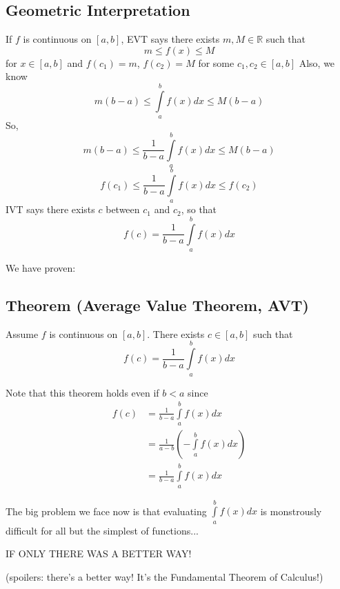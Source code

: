 \subsection{Geometric Interpretation}
If $ f $ is continuous on $ [a,b] $, EVT says there exists $ m,M\in\mathbb{R} $ such that
\[m\le f(x) \le M\]
for $ x\in[a,b] $ and $ f(c_1)=m $, $ f(c_2)=M $ for some $ c_1,c_2\in[a,b] $ 
Also, we know \[ m(b-a)\le \int\limits_{a}^{b} f(x) d{x} \le M(b-a) \]
So,
\[ m(b-a)\le \frac{1}{b-a} \int\limits_{a}^{b} f(x) d{x} \le M(b-a) \]
\[ f(c_1)\le \frac{1}{b-a} \int\limits_{a}^{b} f(x) d{x} \le f(c_2) \]
IVT says there exists $ c $ between $ c_1 $ and $ c_2 $, so that
\[ f(c)=\frac{1}{b-a} \int\limits_{a}^{b} f(x) d{x} \]

We have proven:
\subsection{Theorem (Average Value Theorem, AVT)}
Assume $ f $ is continuous on $ [a,b] $. There exists $ c\in[a,b] $ such that
\[ f(c)=\frac{1}{b-a} \int\limits_{a}^{b} f(x) d{x} \]

\begin{remark}
    Note that this theorem holds even if $ b<a $ since
    \begin{align*}
        f(c)&=\frac{1}{b-a} \int\limits_{a}^{b} f(x) d{x}\\
            &=\frac{1}{a-b}\left(-\int\limits_{a}^{b} f(x) d{x}\right)\\
            &=\frac{1}{b-a} \int\limits_{a}^{b} f(x) d{x}
    \end{align*}
\end{remark}

The big problem we face now is that evaluating $ \int\limits_{a}^{b} f(x) d{x} $ is
monstrously difficult for all but the simplest of functions...

IF ONLY THERE WAS A BETTER WAY!

(spoilers: there's a better way! It's the Fundamental Theorem of Calculus!)
